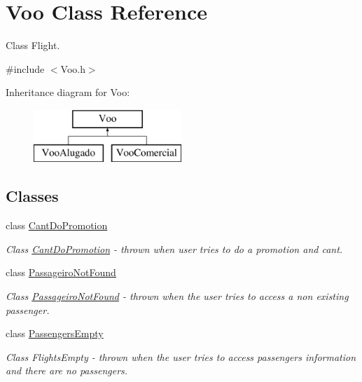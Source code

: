 \hypertarget{class_voo}{}\section{Voo Class Reference}
\label{class_voo}


Class Flight.  




{\ttfamily \#include $<$Voo.\+h$>$}

Inheritance diagram for Voo\+:\begin{figure}[H]
\begin{center}
\leavevmode
\includegraphics[height=2.000000cm]{class_voo}
\end{center}
\end{figure}
\subsection*{Classes}
\begin{DoxyCompactItemize}
\item 
class \hyperlink{class_voo_1_1_cant_do_promotion}{Cant\+Do\+Promotion}
\begin{DoxyCompactList}\small\item\em Class \hyperlink{class_voo_1_1_cant_do_promotion}{Cant\+Do\+Promotion} -\/ thrown when user tries to do a promotion and can\textquotesingle{}t. \end{DoxyCompactList}\item 
class \hyperlink{class_voo_1_1_passageiro_not_found}{Passageiro\+Not\+Found}
\begin{DoxyCompactList}\small\item\em Class \hyperlink{class_voo_1_1_passageiro_not_found}{Passageiro\+Not\+Found} -\/ thrown when the user tries to access a non existing passenger. \end{DoxyCompactList}\item 
class \hyperlink{class_voo_1_1_passengers_empty}{Passengers\+Empty}
\begin{DoxyCompactList}\small\item\em Class Flights\+Empty -\/ thrown when the user tries to access passengers information and there are no passengers. \end{DoxyCompactList}\end{DoxyCompactItemize}
